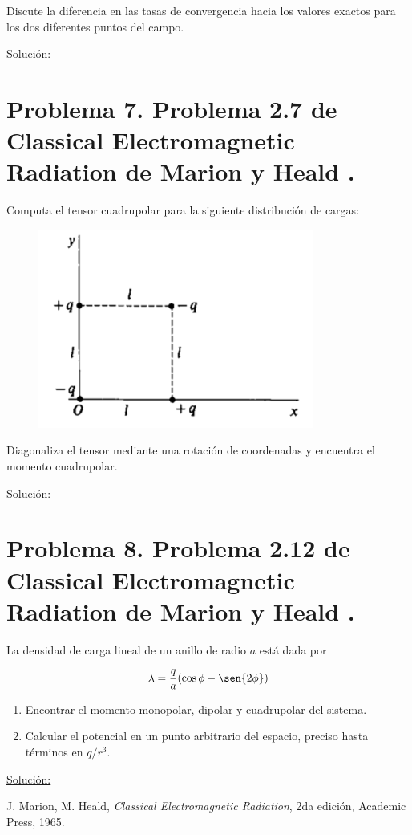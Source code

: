 \documentclass[a4paper,11pt]{article}
\numberwithin{equation}{section}
\begin{document}
Discute la diferencia en las tasas de convergencia hacia los valores exactos para 
los dos diferentes puntos del campo.

\vspace{.3cm}

\underline{Solución:} \vspace{.3cm}

\section{Problema 7. Problema 2.7 de Classical Electromagnetic Radiation
de Marion y Heald \cite{marion2}.}

Computa el tensor cuadrupolar para la siguiente distribución de cargas:

\begin{figure}[H]
\center
 \includegraphics[scale=0.6]{problema7fig1}
\end{figure}

Diagonaliza el tensor mediante una rotación de coordenadas y encuentra el momento
cuadrupolar.

\vspace{.3cm}

\underline{Solución:} \vspace{.3cm}

\section{Problema 8. Problema 2.12 de Classical Electromagnetic Radiation
de Marion y Heald \cite{marion2}.}

La densidad de carga lineal de un anillo de radio $a$ está dada por 

$$
\lambda = \frac{q}{a}(\cos{\phi} - \sen{2\phi})
$$

\begin{enumerate}[label=\textbf{(\alph*)}]
\item Encontrar el momento monopolar, dipolar y cuadrupolar del sistema.
\item Calcular el potencial en un punto arbitrario del espacio, preciso hasta 
términos en $q/r^3$.
\end{enumerate}

\vspace{.3cm}

\underline{Solución:} \vspace{.3cm}

\begin{thebibliography}{10}
J. Marion, M. Heald, \emph{Classical Electromagnetic Radiation}, 2da edición, Academic 
Press, 1965.
\end{thebibliography}
\end{document}

